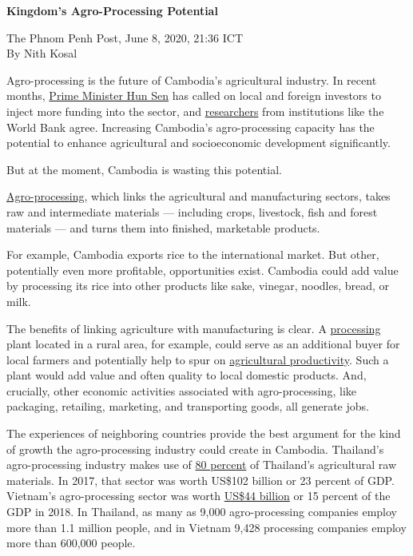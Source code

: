 \documentclass[10pt,a4paper]{letter}
\begin{document}
	
{\Large 
	\textbf{Kingdom's Agro-Processing Potential}
} 

The Phnom Penh Post, June 8, 2020, 21:36 ICT \\
By Nith Kosal

Agro-processing is the future of Cambodia's agricultural industry. In recent months, \href{https://www.khmertimeskh.com/50686215/demand-to-modernise-agriculture}{Prime Minister Hun Sen} has called on local and foreign investors to inject more funding into the sector, and \href{https://www.worldbank.org/en/country/cambodia/publication/cambodian-agriculture-in-transition-opportunities-and-risks}{researchers} from institutions like the World Bank agree. Increasing Cambodia's agro-processing capacity has the potential to enhance agricultural and socioeconomic development significantly.

But at the moment, Cambodia is wasting this potential. 

\href{https://www.agriculturenigeria.com/processing/agro-processing/}{Agro-processing}, which links the agricultural and manufacturing sectors, takes raw and intermediate materials --- including crops, livestock, fish and forest materials --- and turns them into finished, marketable products.

For example, Cambodia exports rice to the international market. But other, potentially even more profitable, opportunities exist. Cambodia could add value by processing its rice into other products like sake, vinegar, noodles, bread, or milk.

The benefits of linking agriculture with manufacturing is clear. A \href{https://www.researchgate.net/publication/323749975_Structural_transformation_in_agriculture_and_agro-processing_value_chains}{processing} plant located in a rural area, for example, could serve as an additional buyer for local farmers and potentially help to spur on \href{http://acetforafrica.org/acet/wp-content/uploads/publications/2017/10/ATR17-overview-english-for-web-0911.pdf}{agricultural productivity}. Such a plant would add value and often quality to local domestic products. And, crucially, other economic activities associated with agro-processing, like packaging, retailing, marketing, and transporting goods, all generate jobs.

The experiences of neighboring countries provide the best argument for the kind of growth the agro-processing industry could create in Cambodia. Thailand's agro-processing industry makes use of \href{http://www.boi.go.th/upload/content/Food%20industry_5aa7b40bd758b.pdf}{80 percent} of Thailand's agricultural raw materials. In 2017, that sector was worth US\$102 billion or 23 percent of GDP. Vietnam's agro-processing sector was worth \href{https://www.fas.usda.gov/data/vietnam-food-processing-ingredients-2}{US\$44 billion} or 15 percent of the GDP in 2018. In Thailand, as many as 9,000 agro-processing companies employ more than 1.1 million people, and in Vietnam 9,428 processing companies employ more than 600,000 people.
\end{document}
